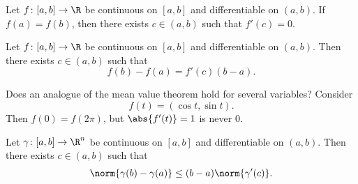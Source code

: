 \begin{theorem} \label{thm:rolle}
    Let $f\colon [a, b] \to \R$ be continuous on $[a, b]$
    and differentiable on $(a, b)$.
    If $f(a) = f(b)$,
    then there exists $c \in (a, b)$ such that $f'(c) = 0$.
\end{theorem}

\begin{theorem} \label{thm:mvt}
    Let $f\colon [a, b] \to \R$ be continuous on $[a, b]$
    and differentiable on $(a, b)$.
    Then there exists $c \in (a, b)$ such that \[
        f(b) - f(a) = f'(c)(b - a).
    \]
\end{theorem}

Does an analogue of the mean value theorem hold for several variables?
Consider \[
    f(t) = (\cos t, \sin t).
\] Then $f(0) = f(2\pi)$, but $\abs{f'(t)} = 1$ is never $0$.

\begin{proposition}
    Let $\gamma\colon [a, b] \to \R^n$ be continuous on $[a, b]$
    and differentiable on $(a, b)$.
    Then there exists $c \in (a, b)$ such that \[
        \norm{\gamma(b) - \gamma(a)} \le (b - a) \norm{\gamma'(c)}.
    \]
\end{proposition}
